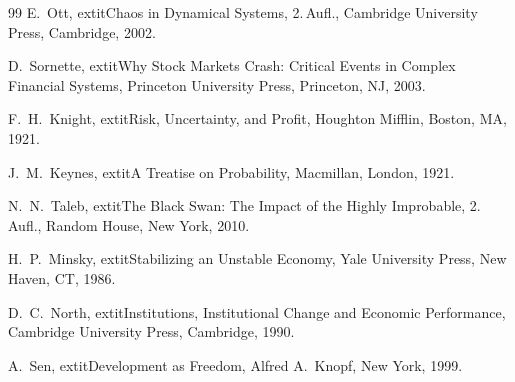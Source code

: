 \documentclass[a4paper, 12pt, twoside, openright]{report}
\theoremstyle{definition}
\theoremstyle{definition}
\begin{document}
\begin{thebibliography}{99}
E.~Ott,
	extit{Chaos in Dynamical Systems},
2.\,Aufl., Cambridge University Press, Cambridge, 2002.

D.~Sornette,
	extit{Why Stock Markets Crash: Critical Events in Complex Financial Systems},
Princeton University Press, Princeton, NJ, 2003.

F.~H.~Knight,
	extit{Risk, Uncertainty, and Profit},
Houghton Mifflin, Boston, MA, 1921.

J.~M.~Keynes,
	extit{A Treatise on Probability},
Macmillan, London, 1921.

N.~N.~Taleb,
	extit{The Black Swan: The Impact of the Highly Improbable},
2.\,Aufl., Random House, New York, 2010.

H.~P.~Minsky,
	extit{Stabilizing an Unstable Economy},
Yale University Press, New Haven, CT, 1986.

D.~C.~North,
	extit{Institutions, Institutional Change and Economic Performance},
Cambridge University Press, Cambridge, 1990.

A.~Sen,
	extit{Development as Freedom},
Alfred A.~Knopf, New York, 1999.

\end{thebibliography}

\cleardoublepage
\end{document}
